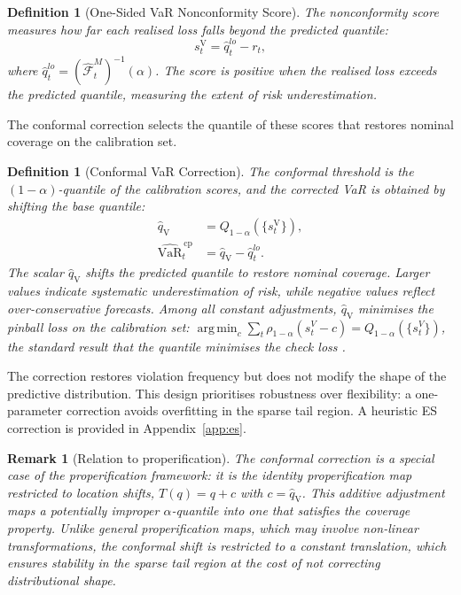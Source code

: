 \documentclass[preprint,11pt,authoryear]{elsarticle}
\DeclareMathOperator*{\argmin}{arg\,min}
\newtheorem{definition}[theorem]{Definition}
\newtheorem{remark}[theorem]{Remark}
\newcommand{\VaR}{\mathrm{VaR}}
\newcommand{\1}{\boldsymbol{1}}
\newcommand{\qV}{\hat{q}_{\scriptscriptstyle\mathrm{V}}}
\newcommand{\Fhat}{\hat{\mathcal{F}}}
\begin{document}
	\begin{definition}[One-Sided VaR Nonconformity Score]
		\label{def:var_score}
		The nonconformity score measures how far each realised
		loss falls beyond the predicted quantile:
		\begin{equation}
			s_t^{\mathrm{V}} = \hat{q}_t^{lo} - r_t,
		\end{equation}
		where $\hat{q}_t^{lo} = (\Fhat_t^M)^{-1}(\alpha)$. The
		score is positive when the realised loss exceeds the
		predicted quantile, measuring the extent of risk
		underestimation.
	\end{definition}
	
	The conformal correction selects the quantile of these scores
	that restores nominal coverage on the calibration set.
	
	\begin{definition}[Conformal VaR Correction]
		\label{def:var_correction}
		The conformal threshold is the $(1-\alpha)$-quantile of
		the calibration scores, and the corrected VaR is obtained
		by shifting the base quantile:
		\begin{align}
			\qV &= Q_{1-\alpha}(\{s_t^{\mathrm{V}}\}), \\
			\widehat{\VaR}_t^{\,\mathrm{cp}}
			&= \qV - \hat{q}_t^{lo}.
		\end{align}
		The scalar $\qV$ shifts the predicted quantile to restore
		nominal coverage. Larger values indicate systematic
		underestimation of risk, while negative values reflect
		over-conservative forecasts. Among all constant
		adjustments, $\qV$ minimises the pinball loss on the
		calibration set: $\argmin_c \sum_t
		\rho_{1-\alpha}(s_t^V - c) = Q_{1-\alpha}(\{s_t^V\})$,
		the standard result that the quantile minimises the check
		loss \citep[Theorem~1.1]{koenker2005quantile}.
	\end{definition}
	
	The correction restores violation frequency but does not
	modify the shape of the predictive distribution. This design
	prioritises robustness over flexibility: a one-parameter
	correction avoids overfitting in the sparse tail region. A
	heuristic ES correction is provided in
	Appendix~\ref{app:es}.
	
	\begin{remark}[Relation to properification]
		The conformal correction is a special case of the
		\citet{brehmer2021properification} properification framework:
		it is the identity properification map restricted to location
		shifts, $T(q) = q + c$ with $c = \qV$. This additive
		adjustment maps a potentially improper $\alpha$-quantile into
		one that satisfies the coverage property. Unlike general
		properification maps, which may involve non-linear
		transformations, the conformal shift is restricted to a
		constant translation, which ensures stability in the
		sparse tail region at the cost of not correcting
		distributional shape.
	\end{remark}
	
\end{document}
